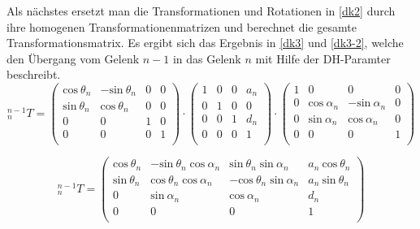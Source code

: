 Als nächstes ersetzt man die Transformationen und Rotationen in \autoref{dk2} durch ihre homogenen Transformationenmatrizen und berechnet die gesamte Transformationsmatrix. Es ergibt sich das Ergebnis in \autoref{dk3} und \ref{dk3-2}, welche den Übergang vom Gelenk $n - 1$ in das Gelenk $n$ mit Hilfe der DH-Paramter beschreibt.
\begin{equation}
  ^{n-1}_{n}T = \begin{pmatrix}
    \textrm{cos}\: \theta_n & -\textrm{sin}\: \theta_n  & 0 & 0\\ 
    \textrm{sin}\: \theta_n & \textrm{cos}\: \theta_n   & 0 & 0\\ 
    0             & 0               & 1 & 0\\ 
    0             & 0               & 0 & 1\\
\end{pmatrix} \cdot
\begin{pmatrix}
  1 & 0 & 0 & a_n\\ 
  0 & 1 & 0 & 0\\ 
  0 & 0 & 1 & d_n\\ 
  0 & 0 & 0 & 1\\
\end{pmatrix} \cdot \begin{pmatrix}
  1 & 0 & 0 & 0\\ 
  0 & \textrm{cos}\: \alpha_n & -\textrm{sin}\: \alpha_n & 0\\ 
  0 & \textrm{sin}\: \alpha_n & \textrm{cos}\: \alpha_n & 0\\ 
  0 & 0 & 0 & 1\\
\end{pmatrix}
\label{dk3}
\end{equation}

\begin{equation}
^{n-1}_{n}T = \begin{pmatrix}
  \textrm{cos}\: \theta_n  & -\textrm{sin}\: \theta_n\; \textrm{cos}\: \alpha_n    & \textrm{sin}\: \theta_n\; \textrm{sin}\: \alpha_n & a_n\: \textrm{cos}\: \theta_n\\ 
  \textrm{sin}\: \theta_n  & \textrm{cos}\: \theta_n\; \textrm{cos}\: \alpha_n     & -\textrm{cos}\: \theta_n\; \textrm{sin}\: \alpha_n & a_n\: \textrm{sin}\: \theta_n\\ 
  0               & \textrm{sin}\: \alpha_n                & \textrm{cos}\: \alpha_n & d_n\\ 
  0               & 0                             & 0 & 1\\
\end{pmatrix}
\label{dk3-2}
\end{equation}

